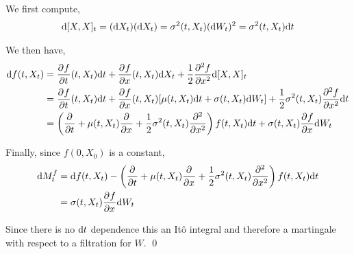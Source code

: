 \begin{solution}[Solution]
We first compute,
\begin{align*}
    \d[X,X]_t = (\d X_t)(\d X_t) = \sigma^2(t,X_t) (\d W_t)^2 = \sigma^2(t,X_t)\d t
\end{align*}

We then have,
\begin{align*}
    \d f(t,X_t) &= \pp{f}{t}(t,X_t) \d t + \pp{f}{x}(t,X_t) \d X_t + \dfrac{1}{2}\pp[2]{f}{x}\d[X,X]_t 
    \\&= \pp{f}{t}(t,X_t) \d t + \pp{f}{x}(t,X_t)  [\mu(t,X_t)\d t +  \sigma(t,X_t)\d W_t] + \dfrac{1}{2}\sigma^2(t,X_t) \pp[2]{f}{x} \d t 
    \\&= \left( \pp{}{t} + \mu(t,X_t) \pp{}{x} + \dfrac{1}{2}\sigma^2(t,X_t) \pp[2]{}{x} \right) f(t,X_t) \d t + \sigma(t,X_t) \pp{f}{x} \d W_t 
\end{align*}

Finally, since \( f(0,X_0) \) is a constant,
\begin{align*}
    \d M_t^f &= \d f(t,X_t) - \left( \pp{}{t} + \mu(t,X_t)\pp{}{x} + \dfrac{1}{2}\sigma^2(t,X_t) \pp[2]{}{x} \right) f(t,X_t) \d t \\
    &= \sigma(t,X_t) \pp{f}{x} \d W_t 
\end{align*}

Since there is no \( \d t \) dependence this an It\^o integral and therefore a martingale with respect to a filtration for \( W \). \qed
\end{solution}

